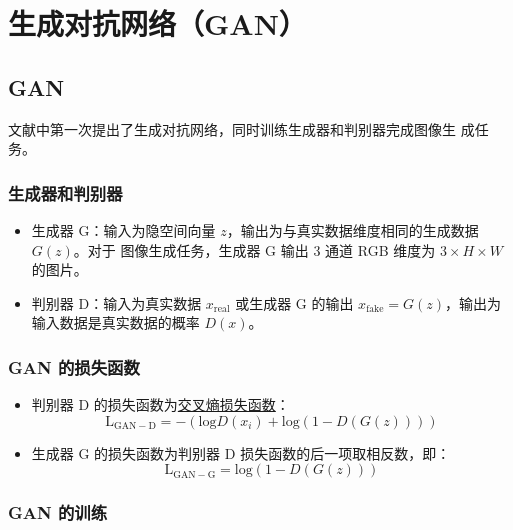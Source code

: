\chapter{生成对抗网络（GAN）}

\section{GAN}

文献中第一次提出了生成对抗网络，同时训练生成器和判别器完成图像生
成任务。

\subsection{生成器和判别器}

\begin{itemize}
  \item 生成器 G：输入为隐空间向量 $z$，输出为与真实数据维度相同的生成数据 $G(z)$。对于
    图像生成任务，生成器 G 输出 3 通道 RGB 维度为 $3 \times H \times W$ 的图片。
  \item 判别器 D：输入为真实数据 $x_{\mathrm{real}}$ 或生成器 G 的输出
    $x_{\mathrm{fake}} = G(z)$，输出为输入数据是真实数据的概率 $D(x)$。
\end{itemize}

\subsection{GAN 的损失函数}
\begin{itemize}
  \item 判别器 D 的损失函数为\hyperref[subsec:CELoss]{交叉熵损失函数}：
  \begin{equation}
    \label{equ:GAN-D}
    \mathrm{L}_{\mathrm{GAN-D}} = - \left( \mathrm{log} D(x_i) + \mathrm{log} (1-D(G(z))) \right )
  \end{equation}

  \item 生成器 G 的损失函数为判别器 D 损失函数的后一项取相反数，即：
  \begin{equation}
    \label{equ:GAN-G}
    \mathrm{L}_{\mathrm{GAN-G}} =  \mathrm{log} (1-D(G(z)))
  \end{equation}

\end{itemize}

\subsection{GAN 的训练}

